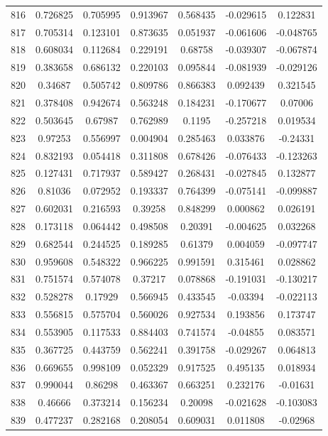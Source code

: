 \begin{table}
\begin{tabular}{c|c|c|c|c|c|c}
816 & 0.726825 & 0.705995 & 0.913967 & 0.568435 & -0.029615 & 0.122831\\
817 & 0.705314 & 0.123101 & 0.873635 & 0.051937 & -0.061606 & -0.048765\\
818 & 0.608034 & 0.112684 & 0.229191 & 0.68758 & -0.039307 & -0.067874\\
819 & 0.383658 & 0.686132 & 0.220103 & 0.095844 & -0.081939 & -0.029126\\
820 & 0.34687 & 0.505742 & 0.809786 & 0.866383 & 0.092439 & 0.321545\\
821 & 0.378408 & 0.942674 & 0.563248 & 0.184231 & -0.170677 & 0.07006\\
822 & 0.503645 & 0.67987 & 0.762989 & 0.1195 & -0.257218 & 0.019534\\
823 & 0.97253 & 0.556997 & 0.004904 & 0.285463 & 0.033876 & -0.24331\\
824 & 0.832193 & 0.054418 & 0.311808 & 0.678426 & -0.076433 & -0.123263\\
825 & 0.127431 & 0.717937 & 0.589427 & 0.268431 & -0.027845 & 0.132877\\
826 & 0.81036 & 0.072952 & 0.193337 & 0.764399 & -0.075141 & -0.099887\\
827 & 0.602031 & 0.216593 & 0.39258 & 0.848299 & 0.000862 & 0.026191\\
828 & 0.173118 & 0.064442 & 0.498508 & 0.20391 & -0.004625 & 0.032268\\
829 & 0.682544 & 0.244525 & 0.189285 & 0.61379 & 0.004059 & -0.097747\\
830 & 0.959608 & 0.548322 & 0.966225 & 0.991591 & 0.315461 & 0.028862\\
831 & 0.751574 & 0.574078 & 0.37217 & 0.078868 & -0.191031 & -0.130217\\
832 & 0.528278 & 0.17929 & 0.566945 & 0.433545 & -0.03394 & -0.022113\\
833 & 0.556815 & 0.575704 & 0.560026 & 0.927534 & 0.193856 & 0.173747\\
834 & 0.553905 & 0.117533 & 0.884403 & 0.741574 & -0.04855 & 0.083571\\
835 & 0.367725 & 0.443759 & 0.562241 & 0.391758 & -0.029267 & 0.064813\\
836 & 0.669655 & 0.998109 & 0.052329 & 0.917525 & 0.495135 & 0.018934\\
837 & 0.990044 & 0.86298 & 0.463367 & 0.663251 & 0.232176 & -0.01631\\
838 & 0.46666 & 0.373214 & 0.156234 & 0.20098 & -0.021628 & -0.103083\\
839 & 0.477237 & 0.282168 & 0.208054 & 0.609031 & 0.011808 & -0.02968\\

\end{tabular}
\end{table}

